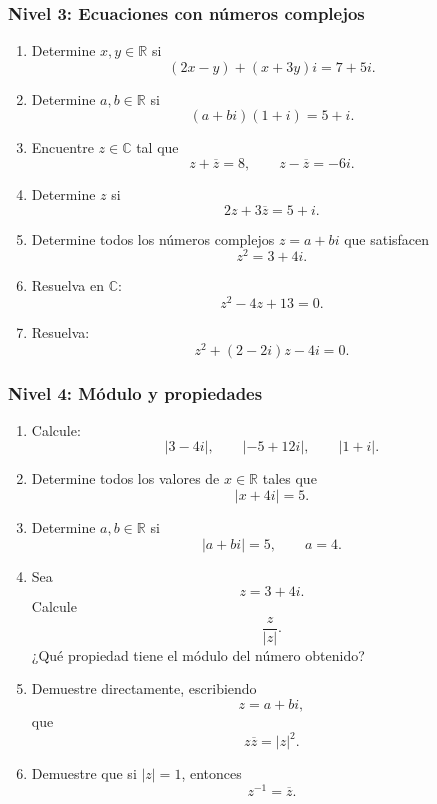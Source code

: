 \subsubsection*{Nivel 3: Ecuaciones con números complejos}

\begin{enumerate}

\item Determine $x,y\in\mathbb{R}$ si
\[
(2x-y)+(x+3y)i=7+5i.
\]

\item Determine $a,b\in\mathbb{R}$ si
\[
(a+bi)(1+i)=5+i.
\]

\item Encuentre $z\in\mathbb{C}$ tal que
\[
z+\overline z=8,
\qquad
z-\overline z=-6i.
\]

\item Determine $z$ si
\[
2z+3\overline z=5+i.
\]

\item Determine todos los números complejos $z=a+bi$ que satisfacen
\[
z^2=3+4i.
\]

\item Resuelva en $\mathbb{C}$:
\[
z^2-4z+13=0.
\]

\item Resuelva:
\[
z^2+(2-2i)z-4i=0.
\]

\end{enumerate}


\subsubsection*{Nivel 4: Módulo y propiedades}

\begin{enumerate}

\item Calcule:
\[
|3-4i|,
\qquad
|-5+12i|,
\qquad
|1+i|.
\]

\item Determine todos los valores de $x\in\mathbb{R}$ tales que
\[
|x+4i|=5.
\]

\item Determine $a,b\in\mathbb{R}$ si
\[
|a+bi|=5,
\qquad a=4.
\]

\item Sea
\[
z=3+4i.
\]
Calcule
\[
\frac{z}{|z|}.
\]
¿Qué propiedad tiene el módulo del número obtenido?

\item Demuestre directamente, escribiendo
\[
z=a+bi,
\]
que
\[
z\overline z=|z|^2.
\]

\item Demuestre que si $|z|=1$, entonces
\[
z^{-1}=\overline z.
\]

\end{enumerate}


